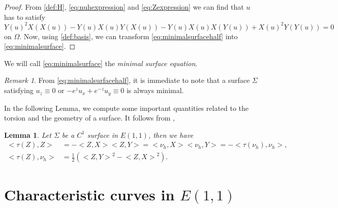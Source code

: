 \documentclass[10pt]{amsart}
\newtheorem{lemma}[theorem]{Lemma}
\theoremstyle{definition}
\theoremstyle{remark}
\newtheorem{remark}[theorem]{Remark}
\numberwithin{equation}{section}
\begin{document}
\begin{proof} From \eqref{def:H}, \eqref{eq:nuhexpression} and \eqref{eq:Zexpression} we can find that $u$ has to satisfy
\begin{equation}\label{eq:minimalsurfacehalf}
Y(u)^2 X(X(u))-Y(u)X(u)Y(X(u))-Y(u)X(u)X(Y(u))+X(u)^2Y(Y(u))=0
\end{equation}
on $\Omega$. Now, using \eqref{def:basis}, we can transform \eqref{eq:minimalsurfacehalf} into \eqref{eq:minimalsurface}.
\end{proof}
We will call \eqref{eq:minimalsurface} the \emph{minimal surface equation}. 

\begin{remark}\label{immediateminimaremark} From \eqref{eq:minimalsurfacehalf}, it  is immediate to note that a surface ${\Sigma}$ satisfying $u_z\equiv 0$ or $-e^z u_x+e^{-z}u_y\equiv 0$ is always minimal. 
\end{remark}

In the following Lemma, we compute some important quantities related to the torsion and the geometry of a surface. It follows from \cite[eq.~9.8]{MR3044134},

\begin{lemma}\label{lem:calcolotausullasuperficie}
Let ${\Sigma}$ be a $C^1$ surface in ${E(1,1)}$, then we have
\begin{equation*}
\begin{split}
{\big<{\tau(Z),Z}\big>}&=-{\big<{Z,X}\big>}{\big<{Z,Y}\big>}={\big<{\nu_h,X}\big>}{\big<{\nu_h,Y}\big>}=-{\big<{\tau(\nu_h),\nu_h}\big>},\\
{\big<{\tau(Z),\nu_h}\big>}&=\frac{1}{2}({\big<{Z,Y}\big>}^2- {\big<{Z,X}\big>}^2).
\end{split}
\end{equation*}
\end{lemma}

\section{Characteristic curves in ${E(1,1)}$}\label{sec:carcurves}
\end{document}
